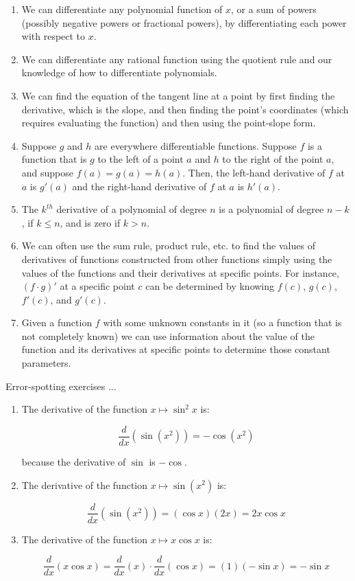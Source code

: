 \documentclass[10pt]{amsart}
\begin{document}
\begin{enumerate}

\item We can differentiate any polynomial function of $x$, or a sum of
  powers (possibly negative powers or fractional powers), by
  differentiating each power with respect to $x$.
\item We can differentiate any rational function using the quotient
  rule and our knowledge of how to differentiate polynomials.
\item We can find the equation of the tangent line at a point by first
  finding the derivative, which is the slope, and then finding the
  point's coordinates (which requires evaluating the function) and
  then using the point-slope form.
\item Suppose $g$ and $h$ are everywhere differentiable
  functions. Suppose $f$ is a function that is $g$ to the left of a
  point $a$ and $h$ to the right of the point $a$, and suppose $f(a) =
  g(a) = h(a)$. Then, the left-hand derivative of $f$ at $a$ is
  $g'(a)$ and the right-hand derivative of $f$ at $a$ is $h'(a)$.
\item The $k^{th}$ derivative of a polynomial of degree $n$ is a
  polynomial of degree $n - k$, if $k \le n$, and is zero if $k > n$.
\item We can often use the sum rule, product rule, etc. to find the
  values of derivatives of functions constructed from other functions
  simply using the values of the functions and their derivatives at
  specific points. For instance, $(f \cdot g)'$ at a specific point
  $c$ can be determined by knowing $f(c)$, $g(c)$, $f'(c)$, and
  $g'(c)$.
\item Given a function $f$ with some unknown constants in it (so a
  function that is not completely known) we can use information about
  the value of the function and its derivatives at specific points to
  determine those constant parameters.
\end{enumerate}

Error-spotting exercises ...

\begin{enumerate}
\item The derivative of the function $x \mapsto \sin^2x$ is:

  $$\frac{d}{dx}(\sin(x^2)) = -\cos (x^2)$$

  because the derivative of $\sin$ is $-\cos$.

\item The derivative of the function $x \mapsto \sin(x^2)$ is:

  $$\frac{d}{dx}(\sin(x^2)) = (\cos x)(2x) = 2x\cos x$$
\item The derivative of the function $x \mapsto x \cos x$ is:

  $$\frac{d}{dx} (x \cos x) = \frac{d}{dx}(x) \cdot \frac{d}{dx}(\cos x) = (1)(-\sin x) = -\sin x$$
\end{enumerate}
\end{document}
